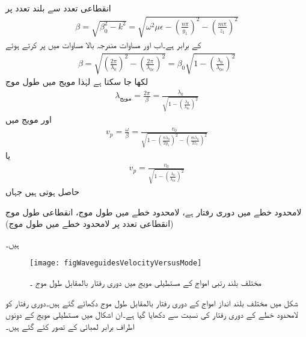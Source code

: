 انقطاعی تعدد سے بلند تعدد   پر
\begin{align}\label{مساوات_مویج_آزاد_اور_قید_زاویائی_مستقل}
\beta=\sqrt{\beta_0^2-k^2}=\sqrt{\omega^2 \mu \epsilon -\left(\frac{n \pi}{y_1}\right)^2-\left(\frac{m \pi}{z_1}\right)^2}
\end{align}
کے برابر ہے۔اب  اور مساوات  مندرجہ بالا مساوات میں پر کرتے ہوئے
\begin{align}
\beta=\sqrt{\left(\frac{2\pi}{\lambda_0}\right)^2-\left(\frac{2\pi}{\lambda_{0c}}\right)^2}=\beta_0 \sqrt{1-\left(\frac{\lambda_0}{\lambda_{0c}}\right)^2}
\end{align}
لکھا جا سکتا ہے لہٰذا  مویج میں طول موج
\begin{align}
\lambda_{\text{مویج}}=\frac{2\pi}{\beta}=\frac{\lambda_0}{\sqrt{1-\left(\frac{\lambda_0}{\lambda_{0c}}\right)^2}}
\end{align}
اور مویج میں  
\begin{align}
v_p =\frac{\omega}{\beta}=\frac{v_0}{\sqrt{1-\left(\frac{n \lambda_0}{2 y_1}\right)^2-\left(\frac{m \lambda_0}{2 z_1}\right)^2}}
\end{align}
یا
\begin{align}
v_p=\frac{v_0}{\sqrt{1-\left(\frac{\lambda_0}{\lambda_{0c}}\right)^2}}
\end{align}
حاصل ہوتی ہیں جہاں
\begin{description}
 لامحدود خطے میں دوری رفتار  ہے،
 لامحدود خطے میں طول موج،
انقطاعی طول موج (انقطاعی تعدد پر لامحدود خطے میں طول موج)
\end{description}
ہیں۔
\begin{figure}
\centering
\texttt{[image: figWaveguidesVelocityVersusMode]}
\caption{مختلف بلند رتبی امواج کے مستطیلی مویج میں دوری رفتار بالمقابل طول موج ۔}
\label{شکل_مویج_دوری_رفتار_مختلف_بلند_انداز}
\end{figure}

شکل  میں مختلف بلند انداز امواج  کے دوری رفتار بالمقابل طول موج  دکھائے گئے ہیں۔دوری رفتار کو لامحدود خطے کے دوری رفتار   کی نسبت سے دکھایا گیا ہے۔ان اشکال میں مستطیلی مویج کے دونوں اطراف برابر لمبائی  کے تصور کئے گئے ہیں۔

